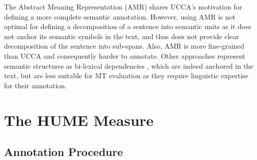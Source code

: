 \documentclass[11pt,letterpaper]{article}
\newcommand{\oa}[1]{\footnote{\color{red}OA: #1}}
\def\perscite#1{\newcite{#1}}
\def\parcite#1{\cite{#1}}
\begin{document}

The Abstract Meaning Representation (AMR) \parcite{banarescu2013abstract}
shares UCCA's motivation for defining a more complete semantic annotation.
However, using AMR is not optimal for defining a decomposition of a sentence into semantic
units as it does not anchor its semantic symbols in the text,
and thus does not provide clear decomposition of the sentence into sub-spans.
Also, AMR is more fine-grained than UCCA and consequently harder to annotate.
Other approaches represent semantic structures as bi-lexical dependencies
\parcite{sgallhp:1986,hajic2012announcing,oepen2006discriminant},
which are indeed anchored in the text, but are less suitable for MT evaluation
as they require linguistic expertise for their annotation.






\section{The HUME Measure}\label{sec:hume}

\subsection{Annotation Procedure}\label{sec:guidelines}
\end{document}

